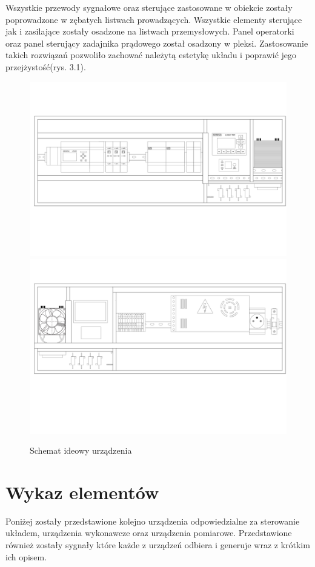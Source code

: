 \documentclass[oneside]{mgr}
\begin{document}
Wszystkie przewody sygnałowe oraz sterujące zastosowane w obiekcie zostały poprowadzone w zębatych listwach prowadzących. Wszystkie elementy sterujące jak i zasilające zostały osadzone na listwach przemysłowych. Panel operatorki oraz panel sterujący zadajnika prądowego został osadzony w pleksi. Zastosowanie takich rozwiązań pozwoliło zachować należytą estetykę układu i poprawić jego przejżystość(rys. 3.1).

\begin{figure}[h!]
    \centering
    \includegraphics[width=\textwidth]{obiekt_front.jpg}
    \includegraphics[width=\textwidth]{obiekt_back.jpg}
    \caption{Schemat ideowy urządzenia}
\end{figure}

\section{Wykaz elementów}
Poniżej zostały przedstawione kolejno urządzenia odpowiedzialne za sterowanie układem, urządzenia wykonawcze oraz urządzenia pomiarowe. Przedstawione również zostały sygnały które każde z urządzeń odbiera i generuje wraz z krótkim ich opisem.
\end{document}
